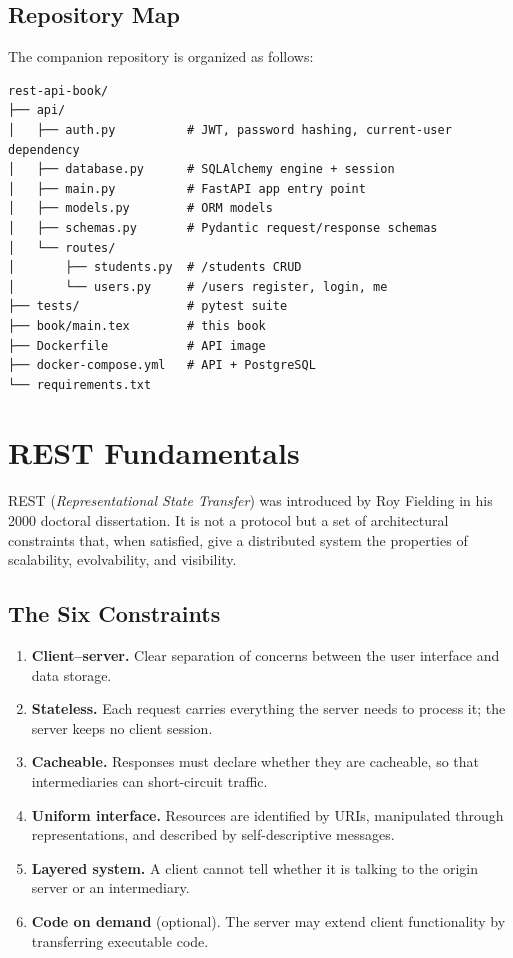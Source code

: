 \documentclass[11pt]{book}
\begin{document}
\section{Repository Map}
The companion repository is organized as follows:
\begin{lstlisting}[style=base]
rest-api-book/
├── api/
│   ├── auth.py          # JWT, password hashing, current-user dependency
│   ├── database.py      # SQLAlchemy engine + session
│   ├── main.py          # FastAPI app entry point
│   ├── models.py        # ORM models
│   ├── schemas.py       # Pydantic request/response schemas
│   └── routes/
│       ├── students.py  # /students CRUD
│       └── users.py     # /users register, login, me
├── tests/               # pytest suite
├── book/main.tex        # this book
├── Dockerfile           # API image
├── docker-compose.yml   # API + PostgreSQL
└── requirements.txt
\end{lstlisting}

\chapter{REST Fundamentals}
\label{ch:rest}

REST (\emph{Representational State Transfer}) was introduced by Roy
Fielding in his 2000 doctoral dissertation. It is not a protocol but a set
of architectural constraints that, when satisfied, give a distributed
system the properties of scalability, evolvability, and visibility.

\section{The Six Constraints}
\begin{enumerate}[leftmargin=*]
  \item \textbf{Client--server.} Clear separation of concerns between the
        user interface and data storage.
  \item \textbf{Stateless.} Each request carries everything the server
        needs to process it; the server keeps no client session.
  \item \textbf{Cacheable.} Responses must declare whether they are
        cacheable, so that intermediaries can short-circuit traffic.
  \item \textbf{Uniform interface.} Resources are identified by URIs,
        manipulated through representations, and described by
        self-descriptive messages.
  \item \textbf{Layered system.} A client cannot tell whether it is
        talking to the origin server or an intermediary.
  \item \textbf{Code on demand} (optional). The server may extend client
        functionality by transferring executable code.
\end{enumerate}
\end{document}
